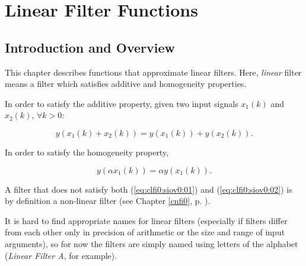 
\chapter{Linear Filter Functions}

\label{clfi0}

\section{Introduction and Overview}
\label{clfi0:siov0}

This chapter describes functions that approximate linear filters.
Here, \emph{linear} filter means a filter which satisfies
additive and homogeneity properties.

In order to satisfy the additive property, given two input signals $x_1(k)$ and $x_2(k)$, $\forall k>0$:

\begin{equation}
\label{eq:clfi0:siov0:01}
y(x_1(k) + x_2(k)) = y(x_1(k)) + y(x_2(k)).
\end{equation}

\noindent{}In order to satisfy the homogeneity property,

\begin{equation}
\label{eq:clfi0:siov0:02}
y(\alpha x_1(k)) = \alpha y(x_1(k)).
\end{equation}

\noindent{}A filter that does not satisfy both
(\ref{eq:clfi0:siov0:01}) and (\ref{eq:clfi0:siov0:02}) is by 
definition a non-linear filter (see Chapter
\ref{cnfi0}, p. \pageref{cnfi0}).

It is hard to find appropriate names for linear filters (especially if
filters differ from each other only in precision of arithmetic or the
size and range of input arguments), so for now the filters
are simply named using letters of the alphabet (\emph{Linear Filter A}, for 
example).


